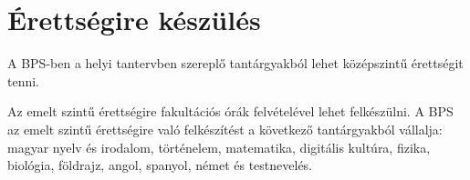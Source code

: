 \hypertarget{erettsegire-keszules}{%
\section{Érettségire készülés}\label{erettsegire-keszules}}

A BPS-ben a helyi tantervben szereplő tantárgyakból lehet középszintű
érettségit tenni.

Az emelt szintű érettségire fakultációs órák felvételével lehet
felkészülni. A BPS az emelt szintű érettségire való felkészítést a
következő tantárgyakból vállalja: magyar nyelv és irodalom, történelem,
matematika, digitális kultúra, fizika, biológia, földrajz, angol,
spanyol, német és testnevelés.

